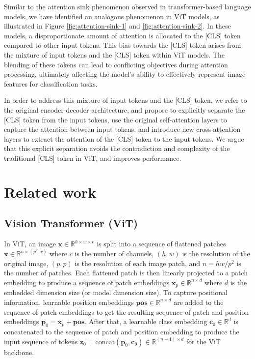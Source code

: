 \documentclass[anon,12pt]{colt2024} %
\begin{document}
Similar to the attention sink phenomenon observed in transformer-based language models, we have identified an analogous phenomenon in ViT models, as illustrated in Figure \ref{fig:attention-sink-1} and \ref{fig:attention-sink-2}. In these models, a disproportionate amount of attention is allocated to the [CLS] token compared to other input tokens.
This bias towards the [CLS] token arises from the mixture of input tokens and the [CLS] token within ViT models.
The blending of these tokens can lead to conflicting objectives during attention processing, ultimately affecting the model's ability to effectively represent image features for classification tasks. 

In order to address this mixture of input tokens and the [CLS] token, we refer to the original encoder-decoder architecture, and propose to explicitly separate the [CLS] token from the input tokens, use the original self-attention layers to capture the attention between input tokens, and introduce new cross-attention layers to extract the attention of the [CLS] token to the input tokens.
We argue that this explicit separation avoids the contradiction and complexity of the traditional [CLS] token in ViT, and improves performance.

\section{Related work}

\subsection{Vision Transformer (ViT)}
In ViT, an image $\mathbf{x} \in \mathbb{R} ^ {h \times w \times c}$ is split into a sequence of flattened patches $\mathbf{x} \in \mathbb{R} ^ {n \times (p^2 \cdot c)}$ where $c$ is the number of channels, $(h,w)$ is the resolution of the original image, $(p,p)$ is the resolution of each image patch, and $n=hw/p^2$ is the number of patches.
Each flattened patch is then linearly projected to a patch embedding to produce a sequence of patch embeddings $\mathbf{x}_p \in \mathbb{R} ^ {n \times d}$ where $d$ is the embedded dimension size (or model dimension size).
To capture positional information, learnable position embeddings $\mathbf{pos} \in \mathbb{R} ^ {n \times d}$ are added to the sequence of patch embeddings to get the resulting sequence of patch and position embeddings $\mathbf{p}_0 = \mathbf{x}_p + \mathbf{pos}$.
After that, a learnable class embedding $\mathbf{c}_0 \in \mathbb{R}^d$ is concatenated to the sequence of patch and position embedding to produce the input sequence of tokens $\mathbf{z}_0 = \mathrm{concat}(\mathbf{p}_0,  \mathbf{c}_0) \in \mathbb{R} ^ {(n+1) \times d}$ for the ViT backbone.
\end{document}
